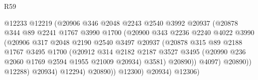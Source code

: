 \begin{lexlean}{R59}
\begin{coremodule}
                                    @12233
                                    @12219
                                    (@20906
                                      @346
                                      @2048
                                      @2243
                                      @2540
                                      @3992
                                      @20937
                                      (@20878
                                        @344
                                        @89
                                        @2241
                                        @1767
                                        @3990
                                        @1700
                                        (@20900
                                          @343
                                          @2236
                                          @2240
                                          @4022
                                          @3990
                                          (@20906
                                            @317
                                            @2048
                                            @2190
                                            @2540
                                            @3497
                                            @20937
                                            (@20878
                                              @315
                                              @89
                                              @2188
                                              @1767
                                              @3495
                                              @1700
                                              (@20912
                                                @314
                                                @2182
                                                @2187
                                                @3527
                                                @3495
                                                (@20990 @236 @2060 @1769 @2594 @1955 @21009 @20934)
                                                @3581)
                                              @20890))
                                          @4097)
                                        @20890))
                                    @12288)
                                  @20934)
                                @12294)
                              @20890))
                          @12300)
                        @20934)
                      @12306)

\end{coremodule}
\end{lexlean}
